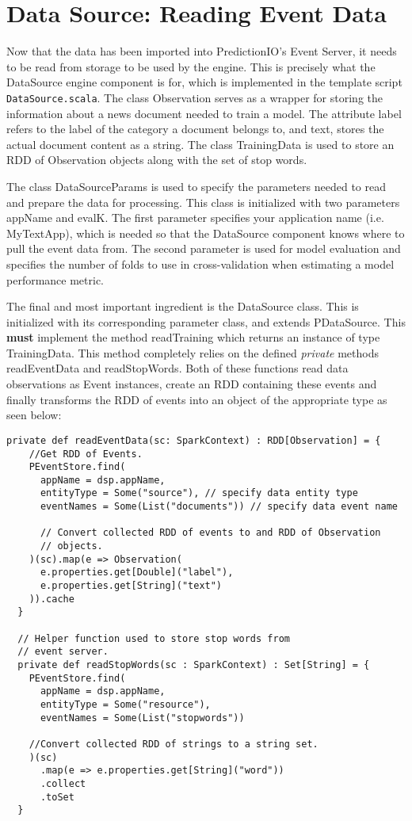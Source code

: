 \documentclass[a4paper,12pt]{article}
\renewcommand{\bf}[1]{\textbf{#1}}
\renewcommand{\it}[1]{\textit{#1}}
\renewcommand{\tt}[1]{\texttt{#1}}
\newcommand{\3}{\left}
\newcommand{\4}{\right}
\renewcommand{\-}[1]{{}^{-#1}}
\begin{document}
\section*{Data Source: Reading Event Data}

Now that the data has been imported into PredictionIO's Event Server, it needs to be read from storage to be used by the engine. This is precisely what the DataSource engine component is for, which is implemented in the template script \tt{DataSource.scala}. The class Observation serves as a wrapper for storing the information about a news document needed to train a model. The attribute label refers to the label of the category a document belongs to, and text, stores the actual document content as a string. The class TrainingData is used to store an RDD of Observation objects along with the set of stop words. 

The class DataSourceParams is used to specify the parameters needed to read and prepare the data for processing. This class is initialized with two parameters appName and evalK. The first parameter specifies your application name (i.e. MyTextApp), which is needed so that the DataSource component knows where to pull the event data from. The second parameter is used for model evaluation and specifies the number of folds to use in cross-validation 
when estimating a model performance metric.

\break

The final and most important ingredient is the DataSource class. This is initialized with its corresponding parameter class, and extends PDataSource. This \bf{must} implement the method readTraining which returns an instance of type TrainingData. This method completely relies on the defined \it{private} methods readEventData and readStopWords. Both of these functions read data observations as Event instances, create an RDD containing these events and finally transforms the RDD of events into an object of the appropriate type as seen below:

\begin{verbatim}
private def readEventData(sc: SparkContext) : RDD[Observation] = {
    //Get RDD of Events.
    PEventStore.find(
      appName = dsp.appName,
      entityType = Some("source"), // specify data entity type
      eventNames = Some(List("documents")) // specify data event name

      // Convert collected RDD of events to and RDD of Observation
      // objects.
    )(sc).map(e => Observation(
      e.properties.get[Double]("label"),
      e.properties.get[String]("text")
    )).cache
  }

  // Helper function used to store stop words from
  // event server.
  private def readStopWords(sc : SparkContext) : Set[String] = {
    PEventStore.find(
      appName = dsp.appName,
      entityType = Some("resource"),
      eventNames = Some(List("stopwords"))

    //Convert collected RDD of strings to a string set.
    )(sc)
      .map(e => e.properties.get[String]("word"))
      .collect
      .toSet
  }
\end{verbatim}
\end{document}
